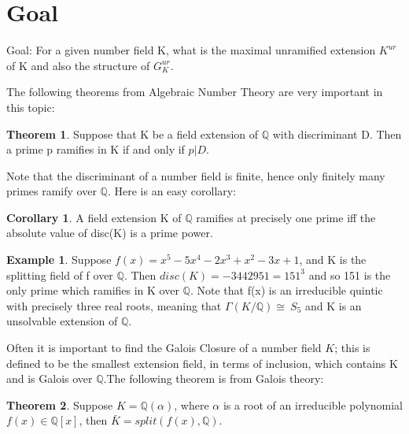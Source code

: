 \documentclass[12pt]{extarticle}
\newcommand{\Q}{\mathbb{Q}}
\newcommand{\GG}{\Gamma(K/\mathbb{Q})}
\newcommand{\spl}{split(f(x),\mathbb{Q})}
\newcommand{\<}{\langle}
\renewcommand{\>}{\rangle}
\theoremstyle{definition}
\newtheorem{theorem}{Theorem}
\newtheorem{corollary}{Corollary}
\newtheorem*{example}{Example}
\begin{document}
\section{Goal}
Goal: For a given number field K, what is the maximal unramified extension $K^{ur}$ of K and also the structure of $G_K^{ur}$. \par
The following theorems from Algebraic Number Theory are very important in this topic:
\begin{theorem}
 Suppose that K be a field extension of $\mathbb{Q}$ with discriminant D. Then a prime p
ramifies in K if and only if $p|D$.   
\end{theorem}
Note that the discriminant of a number field is finite, hence only finitely many primes ramify over $\mathbb{Q}$. Here is an easy corollary:
\begin{corollary}
A field extension K of $\Q$ ramifies at precisely one prime iff the absolute value of disc(K) is a prime power.
\end{corollary}
\begin{example}
    Suppose $f(x)=x^5-5x^4-2x^3+x^2-3x+1$, and K is the splitting field of f over $\Q$. Then $disc(K)=-3442951=151^3$ and so 151 is the only prime which ramifies in K over $\mathbb{Q}$. Note that f(x) is an irreducible quintic with precisely three real roots, meaning that $\GG \cong\ S_5$ and K is an unsolvable extension of $\Q$.
\end{example}
Often it is important to find the Galois Closure of a number field $K$;  this is defined to be the smallest extension field, in terms of inclusion, which contains K and is Galois over $\mathbb{Q}$.The following theorem is  from Galois theory: \begin{theorem}
  Suppose $K=\Q(\alpha)$, where $\alpha$ is a root of an irreducible polynomial $f(x) \in \Q[x]$, then $\bar{K} = \spl$.
\end{theorem}
\end{document}

